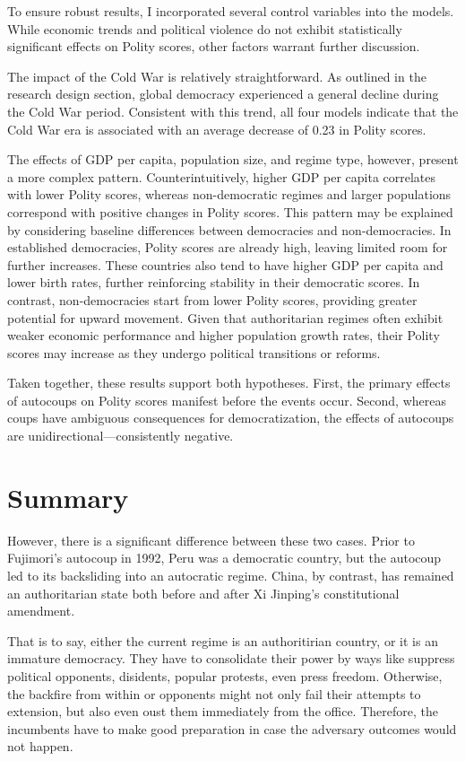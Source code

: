 \documentclass[
  12pt,
]{report}
\begin{document}
To ensure robust results, I incorporated several control variables into
the models. While economic trends and political violence do not exhibit
statistically significant effects on Polity scores, other factors
warrant further discussion.

The impact of the Cold War is relatively straightforward. As outlined in
the research design section, global democracy experienced a general
decline during the Cold War period. Consistent with this trend, all four
models indicate that the Cold War era is associated with an average
decrease of 0.23 in Polity scores.

The effects of GDP per capita, population size, and regime type,
however, present a more complex pattern. Counterintuitively, higher GDP
per capita correlates with lower Polity scores, whereas non-democratic
regimes and larger populations correspond with positive changes in
Polity scores. This pattern may be explained by considering baseline
differences between democracies and non-democracies. In established
democracies, Polity scores are already high, leaving limited room for
further increases. These countries also tend to have higher GDP per
capita and lower birth rates, further reinforcing stability in their
democratic scores. In contrast, non-democracies start from lower Polity
scores, providing greater potential for upward movement. Given that
authoritarian regimes often exhibit weaker economic performance and
higher population growth rates, their Polity scores may increase as they
undergo political transitions or reforms.

Taken together, these results support both hypotheses. First, the
primary effects of autocoups on Polity scores manifest before the events
occur. Second, whereas coups have ambiguous consequences for
democratization, the effects of autocoups are
unidirectional---consistently negative.

\section{Summary}\label{summary-3}

However, there is a significant difference between these two cases.
Prior to Fujimori's autocoup in 1992, Peru was a democratic country, but
the autocoup led to its backsliding into an autocratic regime. China, by
contrast, has remained an authoritarian state both before and after Xi
Jinping's constitutional amendment.

That is to say, either the current regime is an authoritirian country,
or it is an immature democracy. They have to consolidate their power by
ways like suppress political opponents, disidents, popular protests,
even press freedom. Otherwise, the backfire from within or opponents
might not only fail their attempts to extension, but also even oust them
immediately from the office. Therefore, the incumbents have to make good
preparation in case the adversary outcomes would not happen.
\end{document}
